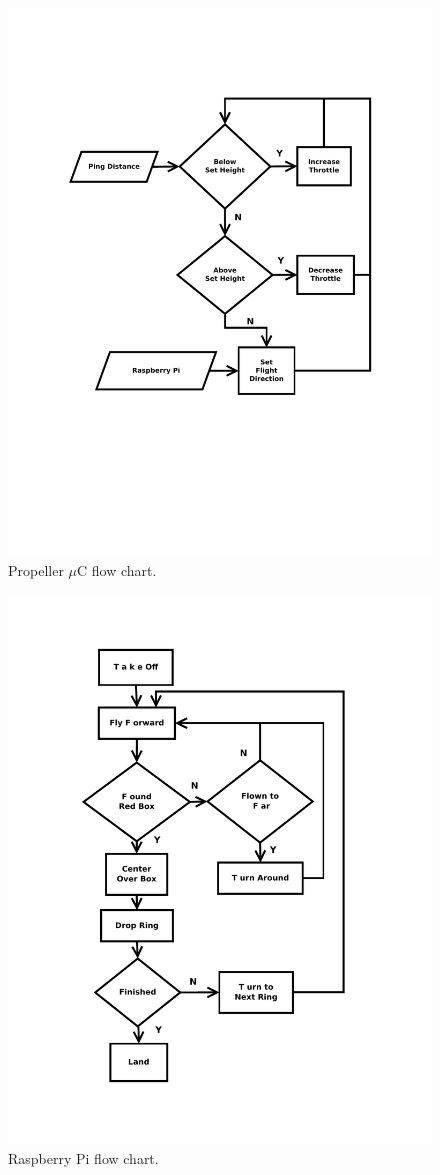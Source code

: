 \documentclass{article}
\begin{document}
\begin{figure}[h]
\caption{Propeller $\mu$C flow chart.}
\includegraphics[width=\textwidth,]{Propeller_Flight.pdf}
\end{figure}

\begin{figure}[h]
\caption{Raspberry Pi flow chart.}
\includegraphics[width=\textwidth,]{raspberrypi.pdf}
\end{figure}
\end{document}
